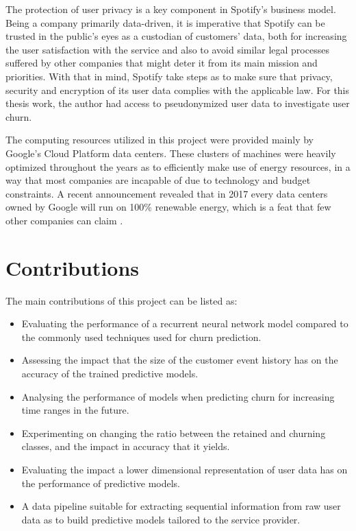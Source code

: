 \documentclass{kththesis}
\begin{document}
The protection of user privacy is a key component in Spotify's business model. Being a company primarily data-driven, it is imperative that Spotify can be trusted in the public's eyes as a custodian of customers' data, both for increasing the user satisfaction with the service and also to avoid similar legal processes suffered by other companies that might deter it from its main mission and priorities. With that in mind, Spotify take steps as to make sure that privacy, security and encryption of its user data complies with the applicable law. For this thesis work, the author had access to pseudonymized user data to investigate user churn.
 

The computing resources utilized in this project were provided mainly by Google's Cloud Platform data centers. These clusters of machines were heavily optimized throughout the years as to efficiently make use of energy resources, in a way that most companies are incapable of due to technology and budget constraints. A recent announcement revealed that in 2017 every data centers owned by Google will run on 100\% renewable energy, which is a feat that few other companies can claim \citep{google2017renew}.  

\section{Contributions}

The main contributions of this project can be listed as:

\begin{itemize}
\item Evaluating the performance of a recurrent neural network model compared to the commonly used techniques used for churn prediction.
\item Assessing the impact that the size of the customer event history has on the accuracy of the trained predictive models.
\item Analysing the performance of models when predicting churn for increasing time ranges in the future.
\item Experimenting on changing the ratio between the retained and churning classes, and the impact in accuracy that it yields.
\item Evaluating the impact a lower dimensional representation of user data has on the performance of predictive models.
\item A data pipeline suitable for extracting sequential information from raw user data as to build predictive models tailored to the service provider.
\end{itemize}
\end{document}
